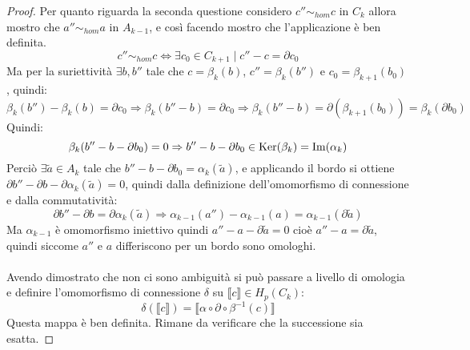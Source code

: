 \begin{proof}
  Per quanto riguarda la seconda questione considero $ c'' \sim_{hom} c $ in $ C_k $
  allora mostro che $ a'' \sim_{hom} a $ in $ A_{k-1} $, e così facendo
  mostro che l'applicazione è ben definita.
  \[
    c'' \sim_{hom} c \iff \exists c_0 \in C_{k+1} \; | \; c'' - c = \partial c_0
  \]
  Ma per la suriettività $ \exists b, b'' $ tale che $ c = \beta_k(b) $,
  $ c'' = \beta_k(b'') $ e $ c_0 = \beta_{k+1}(b_0) $, quindi:
  \[
    \beta_k(b'') - \beta_k(b) = \partial c_0 \Rightarrow \beta_k(b'' - b) = \partial c_0  \Rightarrow
    \beta_k(b''-b) = \partial\left( \beta_{k+1}(b_0)\right) = \beta_{k}(\partial b_0)
  \]
  Quindi:
  \[
    \beta_k(b'' - b - \partial b_0) = 0 \Rightarrow b'' - b - \partial b_0 \in \mathrm{Ker}( \beta_k) = \mathrm{Im}( \alpha_k )
  \]
  Perciò $ \exists \tilde{a} \in A_k$ tale che $ b'' - b - \partial b_0 = \alpha_k (\tilde{a}) $, e
  applicando il bordo si ottiene $ \partial b'' - \partial b - \partial \alpha_k(\tilde{a}) = 0 $, quindi
  dalla definizione dell'omomorfismo di connessione e dalla commutatività:
  \[
    \partial b'' - \partial b = \partial \alpha_{k}(\tilde{a}) \Rightarrow \alpha_{k-1}(a'') - \alpha_{k-1}(a) = \alpha_{k-1}(\partial \tilde{a})
  \]
  Ma $ \alpha_{k-1} $ è omomorfismo iniettivo quindi
  $ a'' - a - \partial \tilde{a} = 0 $ cioè $ a'' - a = \partial \tilde{a} $,
  quindi siccome $ a'' $ e $ a $ differiscono per un bordo sono omologhi.
  \\ \\ \noindent
  Avendo dimostrato che non ci sono ambiguità si può passare a livello di
  omologia e definire l'omomorfismo di connessione $ \delta $ su
  $ \llbracket c \rrbracket \in H_p(C_k) $:
  \[
    \delta(\llbracket c \rrbracket) = \llbracket \alpha \circ \partial \circ \beta^{-1}(c) \rrbracket
  \]
  Questa mappa è ben definita. Rimane da verificare che la successione sia
  esatta.
\end{proof}

